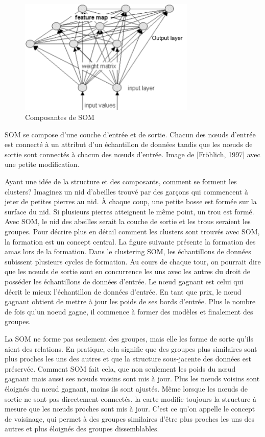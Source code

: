 \documentclass[12pt]{article}
\begin{document}
{\begin{figure}[H]
	\centering
    \includegraphics[width=0.75\textwidth]{image9.png}
     \caption{Composantes de SOM  }
    \label{fig:9}
\end{figure}

SOM se compose d'une couche d'entrée et de sortie. Chacun des nœuds d'entrée est connecté à un attribut d'un échantillon de données tandis que les nœuds de sortie sont connectés à chacun des nœuds d'entrée. Image de  {\color{red}[Fröhlich, 1997]} avec une petite modification.

Ayant une idée de la structure et des composants, comment se forment les clusters? Imaginez un nid d'abeilles trouvé par des garçons qui commencent à jeter de petites pierres au nid. À chaque coup, une petite bosse est formée sur la surface du nid. Si plusieurs pierres atteignent le même point, un trou est formé. Avec SOM, le nid des abeilles serait la couche de sortie et les trous seraient les groupes.
Pour décrire plus en détail comment les clusters sont trouvés avec SOM, la formation est un concept central. La figure suivante présente la formation des amas lors de la formation. Dans le clustering SOM, les échantillons de données subissent plusieurs cycles de formation. Au cours de chaque tour, on pourrait dire que les nœuds de sortie sont en concurrence les uns avec les autres du droit de posséder les échantillons de données d'entrée. Le nœud gagnant est celui qui décrit le mieux l'échantillon de données d'entrée. En tant que prix, le nœud gagnant obtient de mettre à jour les poids de ses bords d'entrée. Plus le nombre de fois qu'un noeud gagne, il commence à former des modèles et finalement des groupes.

La SOM ne forme pas seulement des groupes, mais elle les forme de sorte qu'ils aient des relations. En pratique, cela signifie que des groupes plus similaires sont plus proches les uns des autres et que la structure sous-jacente des données est préservée. Comment SOM fait cela, que non seulement les poids du nœud gagnant mais aussi ses nœuds voisins sont mis à jour. Plus les nœuds voisins sont éloignés du nœud gagnant, moins ils sont ajustés. Même lorsque les nœuds de sortie ne sont pas directement connectés, la carte modifie toujours la structure à mesure que les nœuds proches sont mis à jour. C'est ce qu'on appelle le concept de voisinage, qui permet à des groupes similaires d'être plus proches les uns des autres et plus éloignés des groupes dissemblables.


}
\end{document}
